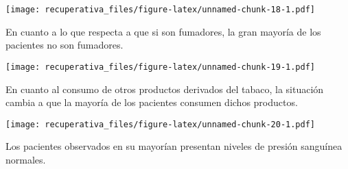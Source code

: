 \documentclass[
  spanish,
]{article}
\newenvironment{Shaded}{\begin{snugshade}}{\end{snugshade}}
\newcommand{\DataTypeTok}[1]{\textcolor[rgb]{0.13,0.29,0.53}{#1}}
\newcommand{\KeywordTok}[1]{\textcolor[rgb]{0.13,0.29,0.53}{\textbf{#1}}}
\newcommand{\NormalTok}[1]{#1}
\newcommand{\OperatorTok}[1]{\textcolor[rgb]{0.81,0.36,0.00}{\textbf{#1}}}
\newcommand{\StringTok}[1]{\textcolor[rgb]{0.31,0.60,0.02}{#1}}
\begin{document}
\texttt{[image: recuperativa\_files/figure-latex/unnamed-chunk-18-1.pdf]}

En cuanto a lo que respecta a que si son fumadores, la gran mayoría de
los pacientes no son fumadores.

\begin{Shaded}
\end{Shaded}

\texttt{[image: recuperativa\_files/figure-latex/unnamed-chunk-19-1.pdf]}

En cuanto al consumo de otros productos derivados del tabaco, la
situación cambia a que la mayoría de los pacientes consumen dichos
productos.

\begin{Shaded}
\end{Shaded}

\texttt{[image: recuperativa\_files/figure-latex/unnamed-chunk-20-1.pdf]}

Los pacientes observados en su mayorían presentan niveles de presión
sanguínea normales.

\begin{Shaded}
\end{Shaded}
\end{document}
